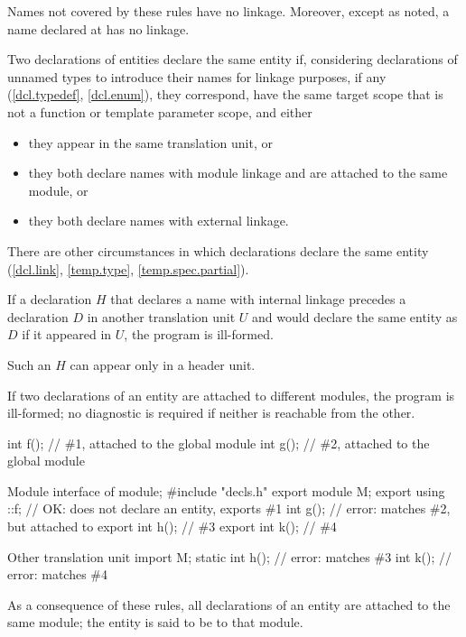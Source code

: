 \pnum
{}%
Names not covered by these rules have no linkage. Moreover, except as
noted, a name declared at  has no
linkage.

\pnum
Two declarations of entities declare the same entity
if, considering declarations of unnamed types to introduce their names
for linkage purposes, if any (\ref{dcl.typedef}, \ref{dcl.enum}),
they correspond,
have the same target scope that is not a function or template parameter scope,
and either
\begin{itemize}
\item
they appear in the same translation unit, or
\item
they both declare names with module linkage and are attached to the same module, or
\item
they both declare names with external linkage.
\end{itemize}
\begin{note}
There are other circumstances in which declarations declare the same entity
(\ref{dcl.link}, \ref{temp.type}, \ref{temp.spec.partial}).
\end{note}

\pnum
If a declaration $H$ that declares a name with internal linkage
precedes a declaration $D$ in another translation unit $U$ and
would declare the same entity as $D$ if it appeared in $U$,
the program is ill-formed.
\begin{note}
Such an $H$ can appear only in a header unit.
\end{note}

\pnum
If two declarations of an entity are
attached to different modules, the program is ill-formed;
no diagnostic is required if neither is reachable from the other.
\begin{example}
\begin{codeblocktu}{}
int f();            // \#1, attached to the global module
int g();            // \#2, attached to the global module
\end{codeblocktu}

\begin{codeblocktu}{Module interface of }
module;
#include "decls.h"
export module M;
export using ::f;   // OK: does not declare an entity, exports \#1
int g();            // error: matches \#2, but attached to 
export int h();     // \#3
export int k();     // \#4
\end{codeblocktu}

\begin{codeblocktu}{Other translation unit}
import M;
static int h();     // error: matches \#3
int k();            // error: matches \#4
\end{codeblocktu}
\end{example}
As a consequence of these rules,
all declarations of an entity are attached to the same module;
the entity is said to be  to that module.

